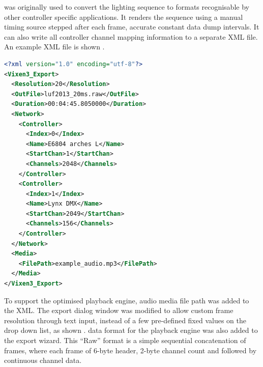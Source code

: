 


 was originally used to convert the lighting sequence to formats recognisable by other controller specific applications. It renders the sequence using a manual timing source stepped after each frame,  accurate constant data dump intervals. It can also write all controller channel mapping information to a separate XML file. An example XML file is shown  .

\begin{lstlisting}[float,floatplacement=ht,language=XML,label=lst:network_xml,captionpos=b,caption={\footnotesize Example controller mapping XML file}]
<?xml version="1.0" encoding="utf-8"?>
<Vixen3_Export>
  <Resolution>20</Resolution>
  <OutFile>luf2013_20ms.raw</OutFile>
  <Duration>00:04:45.8050000</Duration>
  <Network>
    <Controller>
      <Index>0</Index>
      <Name>E6804 arches L</Name>
      <StartChan>1</StartChan>
      <Channels>2048</Channels>
    </Controller>
    <Controller>
      <Index>1</Index>
      <Name>Lynx DMX</Name>
      <StartChan>2049</StartChan>
      <Channels>156</Channels>
    </Controller>
  </Network>
  <Media>
    <FilePath>example_audio.mp3</FilePath>
  </Media>
</Vixen3_Export>
\end{lstlisting}

To support the  optimised playback engine, audio media file path was added to the XML. The export dialog window was modified to allow custom frame resolution through text input, instead of a few pre-defined fixed values on the drop down list, as shown  .  data format  for the playback engine was also added to the export wizard. This ``Raw'' format is a simple sequential concatenation of frames, where each frame  of 6-byte header, 2-byte channel count and  followed by continuous channel data.

